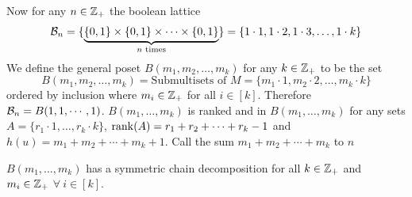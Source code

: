 \documentclass[twoside]{article}
\begin{document}
Now for any $n\in\mathbb{Z}_+$ the boolean lattice $$\mathcal{B}_n=\{\underbrace{\{0,1\}\times\{0,1\}\times\cdots \times \{0,1\}}_{n\text{ times}}\}=\{1\cdot1,1\cdot 2,1\cdot 3,\dots, 1\cdot k\}$$We define the general poset $B(m_1,m_2,\dots, m_k)$ for any $k\in\mathbb{Z}_+$  to be the set $$B(m_1,m_2,\dots, m_k)=\text{Submultisets of }M=\{m_1\cdot 1,m_2\cdot2,\dots, m_k\cdot k\}$$ordered by inclusion where $m_i\in\mathbb{Z}_+$ for all $i\in[k]$. Therefore $\mathcal{B}_n=B({1,1,\cdots, 1})$. $B(m_1,\dots, m_k)$ is ranked and in $B(m_1,\dots, m_k)$ for any sets $A=\{r_1\cdot1,\dots, r_k\cdot k\}$, $\operatorname{rank}(A)=r_1+r_2+\cdots+r_k-1$ and $h(u)=m_1+m_2+\cdots+m_k+1$. Call  the sum $m_1+m_2+\cdots+m_k$ to $n$
\begin{Theorem}{}{}
	$B(m_1,\dots, m_k)$ has a symmetric chain decomposition for all $k\in\mathbb{Z}_+$ and $m_i\in \mathbb{Z}_+$ $\forall\ i\in[k]$. 
\end{Theorem}
\end{document}
